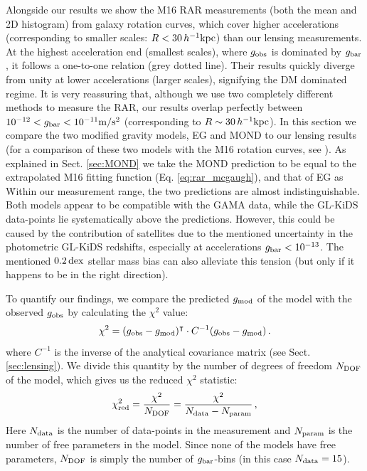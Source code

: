 \documentclass[usenatbib]{mnras}
\newcommand{\hkpc}{\, h^{-1}{\rm{kpc}} }
\newcommand{\mpss}{ {\rm m/s^2} }
\newcommand{\un}[1]{_{\rm #1}}
\newcommand{\dex}{\, {\rm dex}}
\begin{document}
Alongside our results we show the M16 RAR measurements (both the mean and 2D histogram) from galaxy rotation curves, which cover higher accelerations (corresponding to smaller scales: $R < 30 \hkpc$) than our lensing measurements. At the highest acceleration end (smallest scales), where $g\un{obs}$ is dominated by $g\un{bar}$, it follows a one-to-one relation (grey dotted line). Their results quickly diverge from unity at lower accelerations (larger scales), signifying the DM dominated regime. It is very reassuring that, although we use two completely different methods to measure the RAR, our results overlap perfectly between $10^{-12} < g\un{bar} < 10^{-11} \mpss$ (corresponding to $R \sim 30 \hkpc$). In this section we compare the two modified gravity models, EG and MOND to our lensing results (for a comparison of these two models with the M16 rotation curves, see \citealt{lelli2017}). As explained in Sect. \ref{sec:MOND} we take the MOND prediction to be equal to the extrapolated M16 fitting function (Eq. \ref{eq:rar_mcgaugh}), and that of EG as  \. Within our measurement range, the two predictions are almost indistinguishable. Both models appear to be compatible with the GAMA data, while the GL-KiDS data-points lie systematically above the predictions. However, this could be caused by the contribution of satellites due to the mentioned uncertainty in the photometric GL-KiDS redshifts, especially at accelerations $g\un{bar} < 10^{-13}$. The mentioned $0.2 \dex$ stellar mass bias can also alleviate this tension (but only if it happens to be in the right direction).

To quantify our findings, we compare the predicted $g\un{mod}$ of the model with the observed $g\un{obs}$ by calculating the $\chi^2$ value:
\begin{equation}
\chi^2 = (g\un{obs} - g\un{mod})^\intercal \cdot C^{-1}(g\un{obs} - g\un{mod}) \, .
\label{eq:chi2}
\end{equation}
where $C^{-1}$ is the inverse of the analytical covariance matrix (see Sect. \ref{sec:lensing}). We divide this quantity by the number of degrees of freedom $N\un{DOF}$ of the model, which gives us the reduced $\chi^2$ statistic:
\begin{equation}
\chi\un{red}^2 = \frac{\chi^2}{N\un{DOF}} = \frac{\chi^2}{N\un{data} - N\un{param}} \, ,
\end{equation}
Here $N\un{data}$ is the number of data-points in the measurement and $N\un{param}$ is the number of free parameters in the model. Since none of the models have free parameters, $N\un{DOF}$ is simply the number of $g\un{bar}$-bins (in this case $N\un{data}= 15$).
\end{document}
